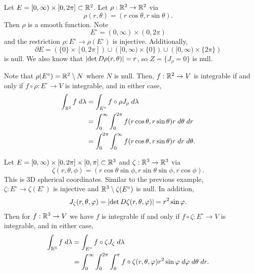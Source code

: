 \documentclass[a4paper]{article}
\begin{document}
\begin{eg}
Let $E = [0, \infty) \times [0, 2 \pi] \subset \mathbb{R}^2$.
Let $\rho: \mathbb{R}^2 \to \mathbb{R}^2$ via
\[
\rho(r, \theta) = (r \cos \theta, r \sin \theta).
\]
Then $\rho$ is a smooth function. Note
\[
E^\circ = (0, \infty) \times (0, 2\pi)
\]
and the restriction $\rho : E^\circ \to \rho(E^\circ)$ is
injective. Additionally,
\[
\partial E = \left( \{0\} \times [0, 2 \pi] \right) \cup
\left( [0, \infty) \times \{0\} \right) \cup
\left( [0, \infty) \times \{2 \pi\} \right)
\]
is null. We also know that $\left\lvert \det D\rho (r, \theta)\right\rvert = r$,
so $Z = \{J_\rho = 0\}$ is null.

Note that $\rho(E^\circ) = \mathbb{R}^2 \setminus N$
where $N$ is null. Then, $f : \mathbb{R}^2 \to V$ is integrable
if and only if $f \circ \rho : E^\circ \to V$ is integrable,
and in either case,
\[
\begin{aligned}
\int_{\mathbb{R}^2} f \; d \lambda
&= \int_{E^\circ} f \circ \rho J_{\rho}  \; d \lambda \\
&= \int_0^\infty \int_0^{2\pi} f(r \cos \theta, r \sin \theta)
r \; d \theta \; d r \\
&= \int_0^{2\pi} \int_0^\infty f(r \cos \theta, r \sin \theta)
r \; d r \; d \theta.
\end{aligned}
\]
\end{eg}

\begin{eg}
Let $E = [0, \infty) \times [0, 2 \pi] \times [0, \pi] \subset
\mathbb{R}^3$ and $\zeta : \mathbb{R}^3 \to \mathbb{R}^3$ via
\[
\zeta(r, \theta, \phi) = (r \cos \theta \sin \phi,
r \sin \theta \sin \phi, r \cos \phi).
\]
This is 3D spherical coordinates. Similar to the previous
example, $\zeta: E^\circ \to \zeta(E^\circ)$ is injective
and $\mathbb{R}^3 \setminus \zeta(E^\circ)$ is null.
In addition,
\[
J_{\zeta}(r, \theta, \varphi) =
\left\lvert \det D \zeta (r, \theta, \varphi)\right\rvert = r^2 \sin \varphi.
\]
Then for $f : \mathbb{R}^3 \to V$ we have $f$ is integrable if and
only if $f \circ \zeta : E^\circ \to V$ is integrable,
and in either case,
\[
\begin{aligned}
\int_{\mathbb{R}^3} f \; d \lambda
&= \int_{E^\circ} f \circ \zeta J_{\zeta} \; d \lambda \\
&= \int_0^\infty \int_0^{2\pi} \int_0^\pi
f \circ \zeta(r, \theta, \varphi) r^2 \sin \varphi \; d \varphi \; d \theta
\; d r.
\end{aligned}
\]
\end{eg}
\end{document}
